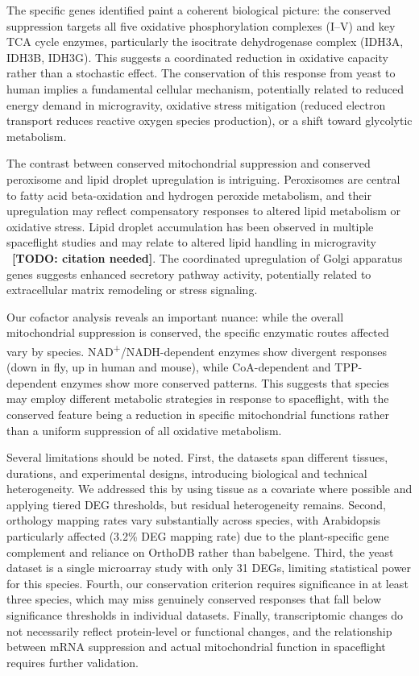 \documentclass[pdflatex,sn-nature]{sn-jnl}
\begin{document}
The specific genes identified paint a coherent biological picture: the conserved
suppression targets all five oxidative phosphorylation complexes (I--V) and key
TCA cycle enzymes, particularly the isocitrate dehydrogenase complex (IDH3A,
IDH3B, IDH3G). This suggests a coordinated reduction in oxidative capacity rather
than a stochastic effect. The conservation of this response from yeast to human
implies a fundamental cellular mechanism, potentially related to reduced energy
demand in microgravity, oxidative stress mitigation (reduced electron transport
reduces reactive oxygen species production), or a shift toward glycolytic
metabolism.

The contrast between conserved mitochondrial suppression and conserved peroxisome
and lipid droplet upregulation is intriguing. Peroxisomes are central to fatty
acid beta-oxidation and hydrogen peroxide metabolism, and their upregulation may
reflect compensatory responses to altered lipid metabolism or oxidative stress.
Lipid droplet accumulation has been observed in multiple spaceflight studies and
may relate to altered lipid handling in microgravity \cite{jonscher2016}~\textbf{[TODO: citation needed]}.
The coordinated upregulation of Golgi apparatus genes suggests enhanced secretory
pathway activity, potentially related to extracellular matrix remodeling or stress
signaling.

Our cofactor analysis reveals an important nuance: while the overall mitochondrial
suppression is conserved, the specific enzymatic routes affected vary by species.
NAD\textsuperscript{+}/NADH-dependent enzymes show divergent responses (down in
fly, up in human and mouse), while CoA-dependent and TPP-dependent enzymes show
more conserved patterns. This suggests that species may employ different metabolic
strategies in response to spaceflight, with the conserved feature being a
reduction in specific mitochondrial functions rather than a uniform suppression of
all oxidative metabolism.

Several limitations should be noted. First, the datasets span different tissues,
durations, and experimental designs, introducing biological and technical
heterogeneity. We addressed this by using tissue as a covariate where possible and
applying tiered DEG thresholds, but residual heterogeneity remains. Second,
orthology mapping rates vary substantially across species, with Arabidopsis
particularly affected (3.2\% DEG mapping rate) due to the plant-specific gene
complement and reliance on OrthoDB rather than babelgene. Third, the yeast dataset
is a single microarray study with only 31 DEGs, limiting statistical power for
this species. Fourth, our conservation criterion requires significance in at least
three species, which may miss genuinely conserved responses that fall below
significance thresholds in individual datasets. Finally, transcriptomic changes do
not necessarily reflect protein-level or functional changes, and the relationship
between mRNA suppression and actual mitochondrial function in spaceflight requires
further validation.
\end{document}
